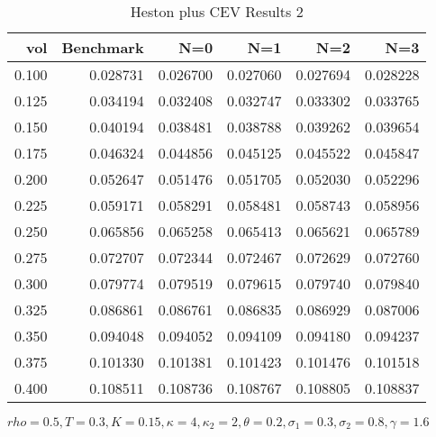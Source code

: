 \begin{table}[ht]
  \centering
  \caption{Heston plus CEV Results 2}
  \begin{tabular}{rrrrrr}
  \toprule
    vol &       Benchmark &       N=0 &       N=1 &       N=2 &       N=3 \\
  \midrule
  0.100 & 0.028731 & 0.026700 & 0.027060 & 0.027694 & 0.028228 \\
  0.125 & 0.034194 & 0.032408 & 0.032747 & 0.033302 & 0.033765 \\
  0.150 & 0.040194 & 0.038481 & 0.038788 & 0.039262 & 0.039654 \\
  0.175 & 0.046324 & 0.044856 & 0.045125 & 0.045522 & 0.045847 \\
  0.200 & 0.052647 & 0.051476 & 0.051705 & 0.052030 & 0.052296 \\
  0.225 & 0.059171 & 0.058291 & 0.058481 & 0.058743 & 0.058956 \\
  0.250 & 0.065856 & 0.065258 & 0.065413 & 0.065621 & 0.065789 \\
  0.275 & 0.072707 & 0.072344 & 0.072467 & 0.072629 & 0.072760 \\
  0.300 & 0.079774 & 0.079519 & 0.079615 & 0.079740 & 0.079840 \\
  0.325 & 0.086861 & 0.086761 & 0.086835 & 0.086929 & 0.087006 \\
  0.350 & 0.094048 & 0.094052 & 0.094109 & 0.094180 & 0.094237 \\
  0.375 & 0.101330 & 0.101381 & 0.101423 & 0.101476 & 0.101518 \\
  0.400 & 0.108511 & 0.108736 & 0.108767 & 0.108805 & 0.108837 \\
  \bottomrule
  \end{tabular}
  \small{$rho = 0.5,T=0.3,K=0.15, \kappa = 4, \kappa_2 =2, \theta =0.2, \sigma_1 =0.3, \sigma_2 = 0.8, \gamma = 1.6$}
\end{table}

